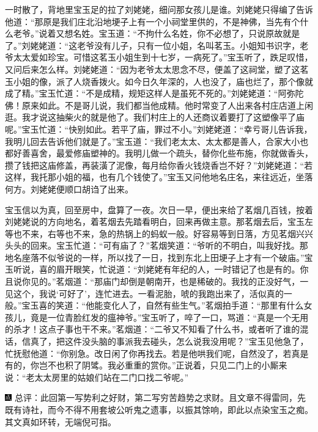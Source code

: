 一时散了，背地里宝玉足的拉了刘姥姥，细问那女孩儿是谁。刘姥姥只得编了告诉他道：``那原是我们庄北沿地埂子上有一个小祠堂里供的，不是神佛，当先有个什么老爷。''说着又想名姓。宝玉道：``不拘什么名姓，你不必想了，只说原故就是了。''刘姥姥道：``这老爷没有儿子，只有一位小姐，名叫茗玉。小姐知书识字，老爷太太爱如珍宝。可惜这茗玉小姐生到十七岁，一病死了。''宝玉听了，跌足叹惜，又问后来怎么样。刘姥姥道：``因为老爷太太思念不尽，便盖了这祠堂，塑了这茗玉小姐的像，派了人烧香拨火。如今日久年深的，人也没了，庙也烂了，那个像就成了精。''宝玉忙道：``不是成精，规矩这样人是虽死不死的。''刘姥姥道：``阿弥陀佛！原来如此。不是哥儿说，我们都当他成精。他时常变了人出来各村庄店道上闲逛。我才说这抽柴火的就是他了。我们村庄上的人还商议着要打了这塑像平了庙呢。''宝玉忙道：``快别如此。若平了庙，罪过不小。''刘姥姥道：``幸亏哥儿告诉我，我明儿回去告诉他们就是了。''宝玉道：``我们老太太、太太都是善人，合家大小也都好善喜舍，最爱修庙塑神的。我明儿做一个疏头，替你化些布施，你就做香头，攒了钱把这庙修盖，再装潢了泥像，每月给你香火钱烧香岂不好？''刘姥姥道：``若这样，我托那小姐的福，也有几个钱使了。''宝玉又问他地名庄名，来往远近，坐落何方。刘姥姥便顺口胡诌了出来。

宝玉信以为真，回至房中，盘算了一夜。次日一早，便出来给了茗烟几百钱，按着刘姥姥说的方向地名，着茗烟去先踏看明白，回来再做主意。那茗烟去后，宝玉左等也不来，右等也不来，急的热锅上的蚂蚁一般。好容易等到日落，方见茗烟兴兴头头的回来。宝玉忙道：``可有庙了？''茗烟笑道：``爷听的不明白，叫我好找。那地名座落不似爷说的一样，所以找了一日，找到东北上田埂子上才有一个破庙。''宝玉听说，喜的眉开眼笑，忙说道：``刘姥姥有年纪的人，一时错记了也是有的。你且说你见的。''茗烟道：``那庙门却倒是朝南开，也是稀破的。我找的正没好气，一见这个，我说`可好了'，连忙进去。一看泥胎，唬的我跑出来了，活似真的一般。''宝玉喜的笑道：``他能变化人了，自然有些生气。''茗烟拍手道：``那里有什么女孩儿，竟是一位青脸红发的瘟神爷。''宝玉听了，啐了一口，骂道：``真是一个无用的杀才！这点子事也干不来。''茗烟道：``二爷又不知看了什么书，或者听了谁的混话，信真了，把这件没头脑的事派我去碰头，怎么说我没用呢？''宝玉见他急了，忙抚慰他道：``你别急。改日闲了你再找去。若是他哄我们呢，自然没了，若真是有的，你岂不也积了阴骘。我必重重的赏你。''正说着，只见二门上的小厮来说：``老太太房里的姑娘们站在二门口找二爷呢。''

{\includegraphics[width=3mm]{../Images/00005}  \kaishu 总评：此回第一写势利之好财，第二写穷苦趋势之求财。且文章不得雷同，先既有诗社，而今不得不用套坡公听鬼之遗事，以振其馀响，即此以点染宝玉之痴。其文真如环转，无端倪可指。}
